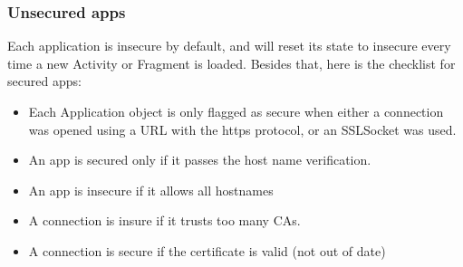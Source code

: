 \documentclass[a4paper, 12pt]{article}
\begin{document}
\subsubsection{Unsecured apps} Each application is insecure by default, and will reset its state to insecure every
time a new Activity or Fragment is loaded. Besides that, here is the checklist for secured apps:
\begin{itemize}
\item Each Application object is only flagged as secure when either a connection was
opened using a URL with the https protocol, or an SSLSocket was used. 
\item An app is secured only if it passes the host name verification.
\item An app is insecure if it allows all hostnames
\item A connection is insure if it trusts too many CAs.
\item A connection is secure if the certificate is valid (not out of date)
\end{itemize}
\end{document}
